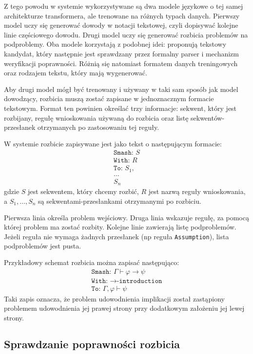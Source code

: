 \documentclass[shortabstract]{iithesis}
\theoremstyle{definition}
\theoremstyle{remark}
\theoremstyle{plain}
\begin{document}
Z tego powodu w systemie wykorzystywane są dwa modele językowe o tej samej
architekturze transformera, ale trenowane na różnych typach danych. Pierwszy model
uczy się generować dowody w notacji tekstowej, czyli dopisywać kolejne linie
częściowego dowodu. Drugi model uczy się generować rozbicia problemów na
podproblemy. Oba modele korzystają z podobnej idei: proponują tekstowy kandydat,
który następnie jest sprawdzany przez formalny parser i mechanizm weryfikacji
poprawności. Różnią się natomiast formatem danych treningowych oraz rodzajem
tekstu, który mają wygenerować.

Aby drugi model mógł być trenowany i używany w taki sam sposób jak model
dowodzący, rozbicia muszą zostać zapisane w jednoznacznym formacie tekstowym.
Format ten powinien określać trzy informacje: sekwent, który jest rozbijany, regułę
wnioskowania używaną do rozbicia oraz listę sekwentów-przesłanek otrzymanych po
zastosowaniu tej reguły.

W systemie rozbicie zapisywane jest jako tekst o następującym formacie:
\[
\begin{array}{l}
\texttt{Smash: } S\\
\texttt{With: } R\\
\texttt{To: } S_1,\\
\ldots\\
S_n
\end{array}
\]
gdzie \(S\) jest sekwentem, który chcemy rozbić, \(R\) jest nazwą reguły
wnioskowania, a \(S_1,\ldots,S_n\) są sekwentami-przesłankami otrzymanymi po
rozbiciu.

Pierwsza linia określa problem wejściowy. Druga linia wskazuje regułę, za pomocą
której problem ma zostać rozbity. Kolejne linie zawierają listę podproblemów. Jeżeli
reguła nie wymaga żadnych przesłanek (np reguła \texttt{Assumption}), lista podproblemów jest pusta. 

Przykładowy schemat rozbicia można zapisać następująco:
\[
\begin{array}{l}
\texttt{Smash: } \Gamma \vdash \varphi \to \psi\\
\texttt{With: } \to\texttt{-introduction}\\
\texttt{To: } \Gamma,\varphi \vdash \psi
\end{array}
\]
Taki zapis oznacza, że problem udowodnienia implikacji został zastąpiony problemem
udowodnienia jej prawej strony przy dodatkowym założeniu jej lewej strony.




\subsection{Sprawdzanie poprawności rozbicia}
\end{document}
